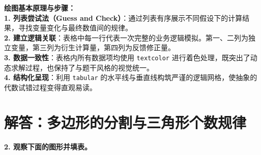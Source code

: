 \documentclass[12pt, a4paper]{ctexrep}
\begin{document}
\vspace{0.6cm}

{\small\color{blue!70!black}
\textbf{绘图基本原理与步骤：}\\
\textbf{1. 列表尝试法（Guess and Check）}：通过列表有序展示不同假设下的计算结果，寻找变量变化与最终数值间的规律。\\
\textbf{2. 建立逻辑关联}：表格中每一行代表一次完整的业务逻辑模拟。第一、二列为独立变量，第三列为衍生计算量，第四列为反馈修正量。\\
\textbf{3. 数据一致性}：表格内所有数据项均使用 \texttt{textcolor} 进行着色处理，既突出了动态求解过程，也保持了与题干风格的视觉统一。\\
\textbf{4. 结构化呈现}：利用 \texttt{tabular} 的水平线与垂直线构筑严谨的逻辑网格，使抽象的代数试错过程变得直观易读。
}



\newpage

\section{解答：多边形的分割与三角形个数规律}

\vspace{0.4cm}

\noindent\textbf{2. 观察下面的图形并填表。}

\vspace{0.8cm}

%
%
\end{document}
